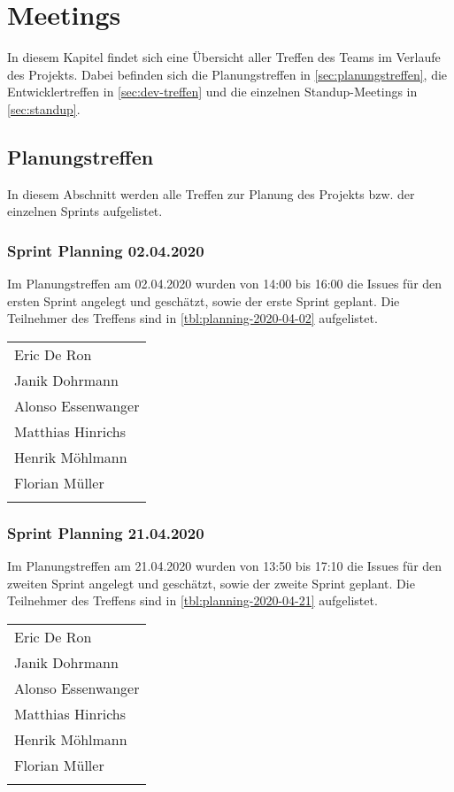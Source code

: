 \keepXColumns
\newcommand{\issueref}[1]{\hyperref[iss:#1]{\##1}}
\chapter{Meetings}
In diesem Kapitel findet sich eine Übersicht aller Treffen des Teams im Verlaufe des Projekts. Dabei befinden sich die Planungstreffen in \autoref{sec:planungstreffen}, die Entwicklertreffen in \autoref{sec:dev-treffen} und die einzelnen Standup-Meetings in \autoref{sec:standup}.
\section{Planungstreffen}
\label{sec:planungstreffen}
	In diesem Abschnitt werden alle Treffen zur Planung des Projekts bzw. der einzelnen Sprints aufgelistet.
	\subsection{Sprint Planning 02.04.2020}
	Im Planungstreffen am 02.04.2020 wurden von 14:00 bis 16:00 die Issues für den ersten Sprint angelegt und geschätzt, sowie der erste Sprint geplant. Die Teilnehmer des Treffens sind in \autoref{tbl:planning-2020-04-02} aufgelistet.
		\begin{tabularx}{0.75\textwidth}{l}
			\hline
			\endhead
			Eric De Ron\\
			Janik Dohrmann\\
			Alonso Essenwanger\\
			Matthias Hinrichs\\
			Henrik Möhlmann\\
			Florian Müller\\
			\hline
			\caption{Teilnehmer 02.04.2020}
			\label{tbl:planning-2020-04-02}
		\end{tabularx}	
	\subsection{Sprint Planning 21.04.2020}
	Im Planungstreffen am 21.04.2020 wurden von 13:50 bis 17:10 die Issues für den zweiten Sprint angelegt und geschätzt, sowie der zweite Sprint geplant. Die Teilnehmer des Treffens sind in \autoref{tbl:planning-2020-04-21} aufgelistet.
	\newpage
		\begin{tabularx}{0.75\textwidth}{l}
			\hline
			\endhead
			Eric De Ron\\
			Janik Dohrmann\\
			Alonso Essenwanger\\
			Matthias Hinrichs\\
			Henrik Möhlmann\\
			Florian Müller\\
			\hline
			\caption{Teilnehmer 21.04.2020}
			\label{tbl:planning-2020-04-21}
		\end{tabularx}
